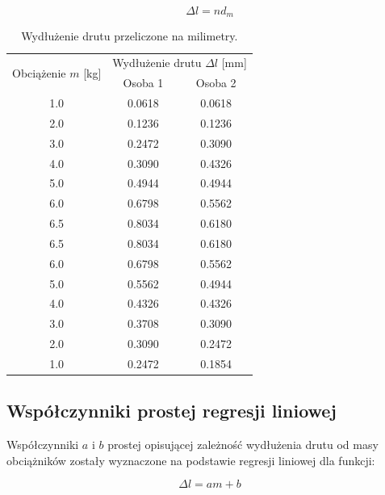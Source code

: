 \documentclass[a4paper,12pt]{article}
\begin{document}
\begin{equation}
\label{eq:delta_l}
\Delta l = n  d_m 
\end{equation}

\begin{table}[h]
    \centering
    \begin{tabular}{|c|c|c|}
        \hline
        \multirow{2}{*}{Obciążenie $m$ [kg]} & \multicolumn{2}{c|}{Wydłużenie drutu $\Delta l$ [mm]} \\
        \cline{2-3}
        & Osoba 1 & Osoba 2 \\
        \hline
        1.0  & 0.0618  & 0.0618  \\ \hline
        2.0  & 0.1236  & 0.1236  \\ \hline
        3.0  & 0.2472  & 0.3090  \\ \hline
        4.0  & 0.3090  & 0.4326  \\ \hline
        5.0  & 0.4944  & 0.4944  \\ \hline
        6.0  & 0.6798  & 0.5562  \\ \hline
        6.5  & 0.8034  & 0.6180  \\ \hline
        6.5  & 0.8034  & 0.6180  \\ \hline
        6.0  & 0.6798  & 0.5562  \\ \hline
        5.0  & 0.5562  & 0.4944  \\ \hline
        4.0  & 0.4326  & 0.4326  \\ \hline
        3.0  & 0.3708  & 0.3090  \\ \hline
        2.0  & 0.3090  & 0.2472  \\ \hline
        1.0  & 0.2472  & 0.1854  \\ \hline
    \end{tabular}
    \caption{Wydłużenie drutu przeliczone na milimetry.}
    \label{tab:wydluzenie_drutu}
\end{table}

\subsection{Współczynniki prostej regresji liniowej}

Współczynniki \( a \) i \( b \) prostej opisującej zależność wydłużenia drutu od masy obciążników zostały wyznaczone na podstawie regresji liniowej dla funkcji:

\begin{equation} \label{eq:prosta_regresji}
\Delta l = a m + b
\end{equation}
\end{document}

